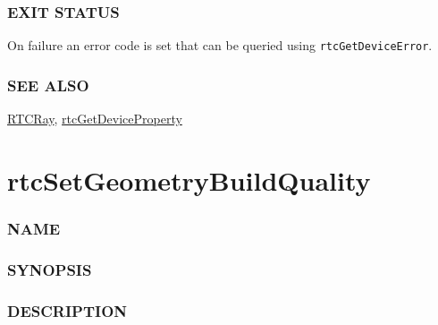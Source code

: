 \subsubsection{EXIT STATUS}\label{exit-status}

On failure an error code is set that can be queried using
\texttt{rtcGetDeviceError}.

\subsubsection{SEE ALSO}\label{see-also}

\hyperref[rtcray]{RTCRay},
\hyperref[rtcgetdeviceproperty]{rtcGetDeviceProperty}

\pagebreak

\section{rtcSetGeometryBuildQuality}\label{rtcsetgeometrybuildquality}

\subsubsection{NAME}\label{name}

\begin{Shaded}
\begin{Highlighting}[]
\OperatorTok{{-}}
\end{Highlighting}
\end{Shaded}

\subsubsection{SYNOPSIS}\label{synopsis}

\begin{Shaded}
\begin{Highlighting}[]

\OperatorTok{(}
\OperatorTok{,}
\OperatorTok{);}
\end{Highlighting}
\end{Shaded}

\subsubsection{DESCRIPTION}\label{description}


